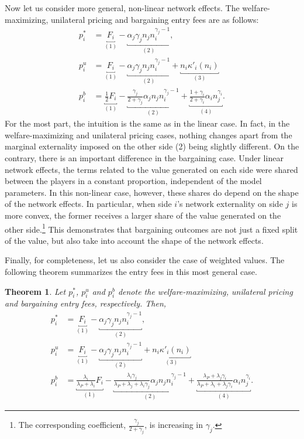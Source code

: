 \documentclass[a4paper]{article}
\newtheorem{theorem}{Theorem}
\begin{document}
Now let us consider more general, non-linear network effects.
The welfare-maximizing, unilateral pricing and bargaining entry fees are as follows:
\begin{align*}
    p_i^* &= \underbracket{F_i}_{(1)} - \underbracket{\alpha_j \gamma_j n_j n_i^{\gamma_j - 1}}_{(2)}, \\
    p_i^u &= \underbracket{F_i}_{(1)} - \underbracket{\alpha_j \gamma_j n_j n_i^{\gamma_j - 1}}_{(2)} + \underbracket{n_i \kappa'_i(n_i)}_{(3)} \\
    p_i^b &= \underbracket{\frac{1}{2} F_i}_{(1)} - \underbracket{\frac{\gamma_j}{2 + \gamma_j} \alpha_j n_j n_i^{\gamma_j - 1}}_{(2)} + \underbracket{\frac{1 + \gamma_i}{2 + \gamma_i} \alpha_i n_j^{\gamma_i}}_{(4)}.
\end{align*}
For the most part, the intuition is the same as in the linear case.
In fact, in the welfare-maximizing and unilateral pricing cases, nothing changes apart from the marginal externality imposed on the other side (2) being slightly different.
On the contrary, there is an important difference in the bargaining case.
Under linear network effects, the terms related to the value generated on each side were shared between the players in a constant proportion, independent of the model parameters.
In this non-linear case, however, these shares do depend on the shape of the network effects.
In particular, when side $i$'s network externality on side $j$ is more convex, the former receives a larger share of the value generated on the other side.\footnote{
    The corresponding coefficient, $\frac{\gamma_j}{2 + \gamma_j}$, is increasing in $\gamma_j$.
}
This demonstrates that bargaining outcomes are not just a fixed split of the value, but also take into account the shape of the network effects.

Finally, for completeness, let us also consider the case of weighted values.
The following theorem summarizes the entry fees in this most general case.
\begin{theorem}
    \label{prop:all_entry_fees}
    Let $p_i^*$, $p_i^u$ and $p_i^b$ denote the welfare-maximizing, unilateral pricing and bargaining entry fees, respectively.
    Then,
    \begin{align*}
        p_i^* &= \underbracket{F_i}_{(1)} - \underbracket{\alpha_j \gamma_j n_j n_i^{\gamma_j - 1}}_{(2)}, \\
        p_i^u &= \underbracket{F_i}_{(1)} - \underbracket{\alpha_j \gamma_j n_j n_i^{\gamma_j - 1}}_{(2)} + \underbracket{n_i \kappa'_i(n_i)}_{(3)} \\
        p_i^b &= \underbracket{\frac{\lambda_i}{\lambda_P + \lambda_i} F_i}_{(1)} - \underbracket{\frac{\lambda_i \gamma_j}{\lambda_P + \lambda_j + \lambda_i\gamma_j} \alpha_j n_j n_i^{\gamma_j - 1}}_{(2)} + \underbracket{\frac{\lambda_P + \lambda_j\gamma_i}{\lambda_P + \lambda_i + \lambda_j\gamma_i} \alpha_i n_j^{\gamma_i}}_{(4)}.
    \end{align*}
\end{theorem}
\end{document}
